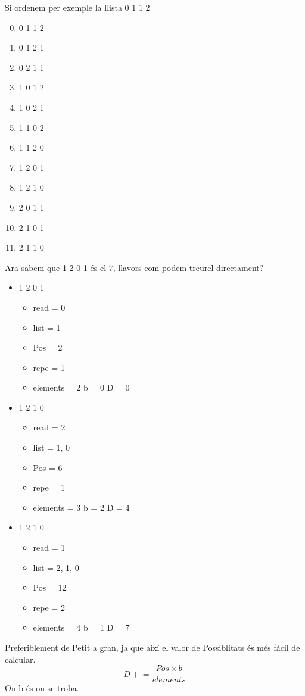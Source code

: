 \documentclass{article}
\begin{document}
Si ordenem per exemple la llista 0 1 1 2
\begin{enumerate}
\setcounter{enumi}{-1}
\item 0 1 1 2
\item 0 1 2 1
\item 0 2 1 1
\item 1 0 1 2
\item 1 0 2 1
\item 1 1 0 2
\item 1 1 2 0
\item 1 2 0 1
\item 1 2 1 0
\item 2 0 1 1
\item 2 1 0 1
\item 2 1 1 0
\end{enumerate}

Ara sabem que 1 2 0 1 és el 7, llavors com podem treurel directament?
\begin{itemize}
\item 1 2 0 1
	\begin{itemize}
	\item read = 0
	\item list = {1}
	\item Pos = 2
	\item repe = 1
	\item elements = 2
		\subitem b = 0
		\subitem D = 0
	\end{itemize}

\item 1 2 1 0
	\begin{itemize}
	\item read = 2
	\item list = {1, 0}
	\item Pos = 6
	\item repe = 1
	\item elements = 3
		\subitem b = 2
		\subitem D = 4
	\end{itemize}

\item 1 2 1 0
	\begin{itemize}
	\item read = 1
	\item list = {2, 1, 0}
	\item Pos = 12
	\item repe = 2
	\item elements = 4
		\subitem b = 1
		\subitem D = 7
	\end{itemize}
\end{itemize}
Preferiblement de Petit a gran, ja que així el valor de Possiblitats és més fàcil de calcular.
$$D +\!\!\!= \frac{Pos \times b}{elements}$$
On b és on se troba.
\end{document}
